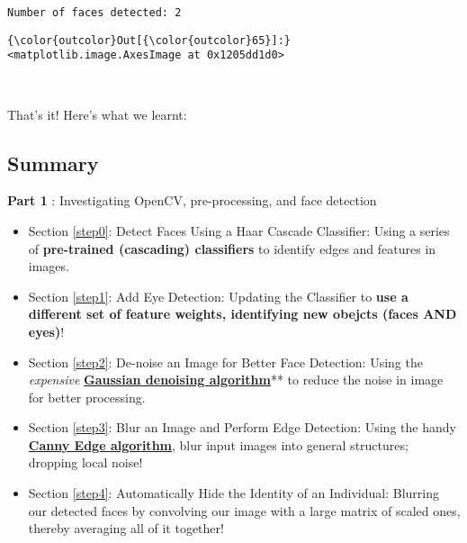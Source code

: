 \documentclass[11pt]{article}
\providecommand{\tightlist}{%
      \setlength{\itemsep}{0pt}\setlength{\parskip}{0pt}}
\begin{document}
    \begin{Verbatim}[commandchars=\\\{\}]
Number of faces detected: 2

    \end{Verbatim}

\begin{Verbatim}[commandchars=\\\{\}]
{\color{outcolor}Out[{\color{outcolor}65}]:} <matplotlib.image.AxesImage at 0x1205dd1d0>
\end{Verbatim}
            
    \begin{center}
    \end{center}
    { \hspace*{\fill} \\}
    
    That's it! Here's what we learnt:

\subsection{Summary}\label{summary}

\textbf{Part 1} : Investigating OpenCV, pre-processing, and face
detection

\begin{itemize}
\tightlist
\item
  Section \ref{step0}: Detect Faces Using a Haar Cascade Classifier:
  Using a series of \textbf{pre-trained (cascading) classifiers} to
  identify edges and features in images.
\item
  Section \ref{step1}: Add Eye Detection: Updating the Classifier to
  \textbf{use a different set of feature weights, identifying new
  obejcts (faces AND eyes)}!
\item
  Section \ref{step2}: De-noise an Image for Better Face Detection:
  Using the \emph{expensive}
  \href{http://opencv-python-tutroals.readthedocs.io/en/latest/py_tutorials/py_photo/py_non_local_means/py_non_local_means.html}{\textbf{Gaussian
  denoising algorithm}}** to reduce the noise in image for better
  processing.
\item
  Section \ref{step3}: Blur an Image and Perform Edge Detection: Using
  the handy
  \href{http://opencv-python-tutroals.readthedocs.io/en/latest/py_tutorials/py_imgproc/py_canny/py_canny.html}{\textbf{Canny
  Edge algorithm}}, blur input images into general structures; dropping
  local noise!
\item
  Section \ref{step4}: Automatically Hide the Identity of an Individual:
  Blurring our detected faces by convolving our image with a large
  matrix of scaled ones, thereby averaging all of it together!
\end{itemize}
\end{document}

